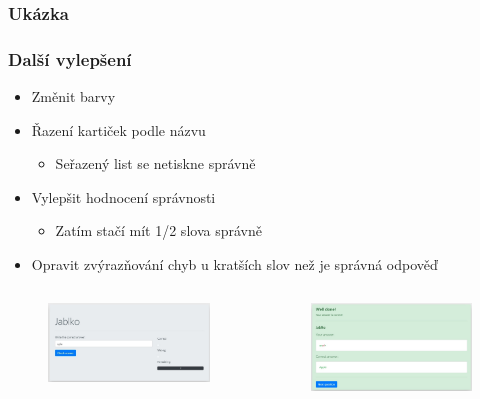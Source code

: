 \documentclass[9pt]{beamer}
\begin{document}
    \begin{frame}
        \frametitle{Ukázka}
    \end{frame}
    \begin{frame}
        \frametitle{Další vylepšení}
        \begin{itemize}
            \item<1-> Změnit barvy
            \item<1-> Řazení kartiček podle názvu
            \begin{itemize}
                \item<1-> Seřazený list se netiskne správně
            \end{itemize}
            \item<1-> Vylepšit hodnocení správnosti
            \begin{itemize}
                \item<1-> Zatím stačí mít 1/2 slova správně
            \end{itemize}
            \item<1-> Opravit zvýrazňování chyb u kratších slov než je správná odpověď
        \end{itemize}
        \begin{columns}
            \begin{figure}
                \centering
                \includegraphics[width=\linewidth]{highlight-error_1.jpg}
            \end{figure}
            \begin{figure}
                \centering
                \includegraphics[width=\linewidth]{highlight-error_2.jpg}

\end{figure}
\end{columns}
\end{frame}
\end{document}
